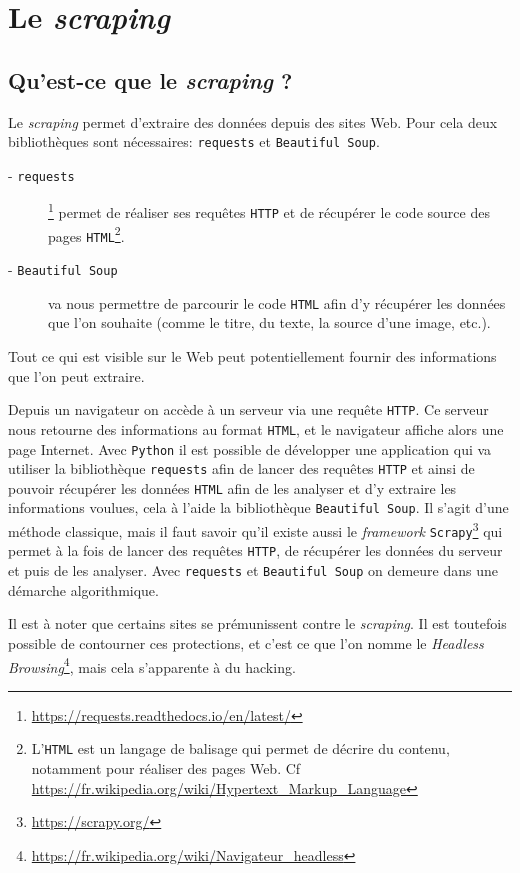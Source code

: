\documentclass[a4paper,12pt]{book}
\begin{document}
\chapter{Le \textit{scraping}}
\section{Qu'est-ce que le \textit{scraping} ?}
Le \textit{scraping} permet d'extraire des données depuis des sites Web. Pour cela deux bibliothèques sont nécessaires: \texttt{requests} et \texttt{Beautiful Soup}.
\begin{description}
	\item[- \texttt{requests}]\footnote{\url{https://requests.readthedocs.io/en/latest/}} permet de réaliser ses requêtes \texttt{HTTP} et de récupérer le code source des pages \texttt{HTML}\footnote{L'\texttt{HTML} est un langage de balisage qui permet de décrire du contenu, notamment pour réaliser des pages Web. Cf \url{https://fr.wikipedia.org/wiki/Hypertext_Markup_Language}}.
	\item[- \texttt{Beautiful Soup}] va nous permettre de parcourir le code \texttt{HTML} afin d'y récupérer les données que l'on souhaite (comme le titre, du texte, la source d'une image, etc.).
\end{description}
\medskip

Tout ce qui est visible sur le Web peut potentiellement fournir des informations que l'on peut extraire.
\medskip

Depuis un navigateur on accède à un serveur via une requête \texttt{HTTP}. Ce serveur nous retourne des informations au format \texttt{HTML}, et le navigateur affiche alors une page Internet. Avec \texttt{Python} il est possible de développer une application qui va utiliser la bibliothèque \texttt{requests} afin de lancer des requêtes \texttt{HTTP} et ainsi de pouvoir récupérer les données \texttt{HTML} afin de les analyser et d'y extraire les informations voulues, cela à l'aide la bibliothèque \texttt{Beautiful Soup}. Il s'agit d'une méthode classique, mais il faut savoir qu'il existe aussi le \textit{framework} \texttt{Scrapy}\footnote{\url{https://scrapy.org/}} qui permet à la fois de lancer des requêtes \texttt{HTTP}, de récupérer les données du serveur et puis de les analyser. Avec \texttt{requests} et \texttt{Beautiful Soup} on demeure dans une démarche algorithmique.
\medskip

Il est à noter que certains sites se prémunissent contre le \textit{scraping}. Il est toutefois possible de contourner ces protections, et c'est ce que l'on nomme le \textit{Headless Browsing}\footnote{\url{https://fr.wikipedia.org/wiki/Navigateur_headless}}, mais cela s'apparente à du hacking.
\end{document}
